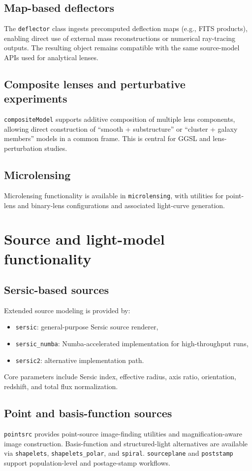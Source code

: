\documentclass{aa}
\begin{document}
\subsection{Map-based deflectors}
The \texttt{deflector} class ingests precomputed deflection maps (e.g., FITS products), enabling direct use of external mass reconstructions or numerical ray-tracing outputs. The resulting object remains compatible with the same source-model APIs used for analytical lenses.

\subsection{Composite lenses and perturbative experiments}
\texttt{compositeModel} supports additive composition of multiple lens components, allowing direct construction of ``smooth + substructure'' or ``cluster + galaxy members'' models in a common frame. This is central for GGSL and lens-perturbation studies.

\subsection{Microlensing}
Microlensing functionality is available in \texttt{microlensing}, with utilities for point-lens and binary-lens configurations and associated light-curve generation.

\section{Source and light-model functionality}
\subsection{Sersic-based sources}
Extended source modeling is provided by:
\begin{itemize}
\item \texttt{sersic}: general-purpose Sersic source renderer,
\item \texttt{sersic\_numba}: Numba-accelerated implementation for high-throughput runs,
\item \texttt{sersic2}: alternative implementation path.
\end{itemize}
Core parameters include Sersic index, effective radius, axis ratio, orientation, redshift, and total flux normalization.

\subsection{Point and basis-function sources}
\texttt{pointsrc} provides point-source image-finding utilities and magnification-aware image construction. Basis-function and structured-light alternatives are available via \texttt{shapelets}, \texttt{shapelets\_polar}, and \texttt{spiral}. \texttt{sourceplane} and \texttt{poststamp} support population-level and postage-stamp workflows.
\end{document}
